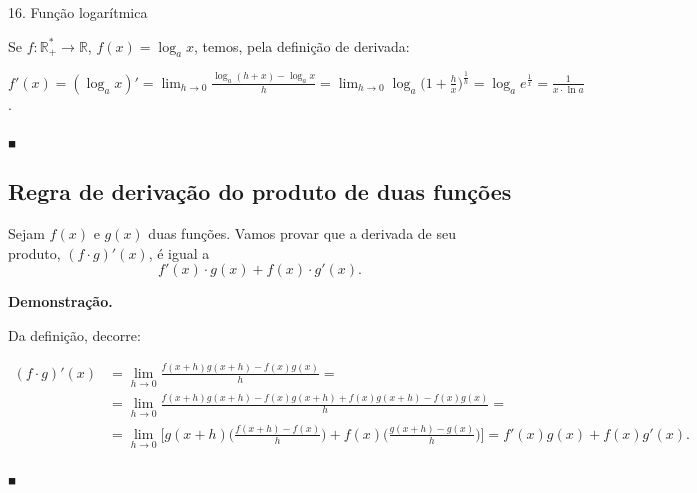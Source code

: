 \documentclass{article}
\begin{document}
{\begin{newpage}
\par
\vspace{0.3cm}
\begin{flushleft}
16. Função logarítmica
\end{flushleft}
\par Se $f:\mathbb{R^{*}_{+}}\rightarrow\mathbb{R}$, $f(x)=\log_{a}{x}$, temos, pela definição de derivada:
\par $f'(x)=(\log_{a}{x})'=\displaystyle{\lim_{h\to 0} \frac{\log_{a}{(h+x)} - \log_{a}{x}}{h}} = \displaystyle{\lim_{h\to 0} \log_{a}{\Big(1+\frac{h}{x}\Big)^{\frac{1}{h}}} = \log_{a}{e^{\frac{1}{x}}}} = \frac{1}{x\cdot\ln{a}}$.\begin{flushright} $_{\blacksquare }$ \end{flushright}
\par
\vspace{0.3cm}
\subsection{Regra de derivação do produto de duas funções}
\par\hspace{12pt}Sejam $f(x)$ e $g(x)$ duas funções. Vamos provar que a derivada de seu produto, $(f\cdot g)'(x)$, é igual a $$f'(x)\cdot g(x) + f(x)\cdot g'(x).$$
\par
\vspace{0.3cm}
\par
\textbf{Demonstração.}
\par
Da definição, decorre:
\vspace{0.3cm}

\begin{equation*}\begin{split}
(f\cdot g)'(x)&=\lim_{h\to 0}\frac{f(x+h)g(x+h)-f(x)g(x)}{h} =\\
&=\lim_{h\to 0} \frac{f(x+h)g(x+h) - f(x)g(x+h) + f(x)g(x+h) - f(x)g(x)}{h}=\\   
&=\lim_{h\to 0} \Big[g(x+h)\Big(\frac{f(x+h) - f(x)}{h}\Big)  +f(x)\Big(\frac{g(x+h) - g(x)}{h}\Big)\Big] = f'(x)g(x) + f(x)g'(x).
\end{split}
\end{equation*}
\begin{flushright} $_{\blacksquare}$ \end{flushright}
\vspace{0.3cm}

\end{newpage}}
\end{document}
